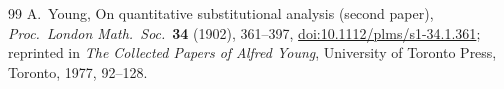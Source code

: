 \documentclass[11pt]{article}
\theoremstyle{remark}
\begin{document}
\begin{thebibliography}{99}
A.~Young, On quantitative substitutional analysis (second paper),
\emph{Proc.\ London Math.\ Soc.}\ \textbf{34} (1902), 361--397,
\href{https://doi.org/10.1112/plms/s1-34.1.361}{doi:10.1112/plms/s1-34.1.361};
reprinted in \emph{The Collected Papers of Alfred Young}, University of
Toronto Press, Toronto, 1977, 92--128.

\end{thebibliography}
\end{document}
